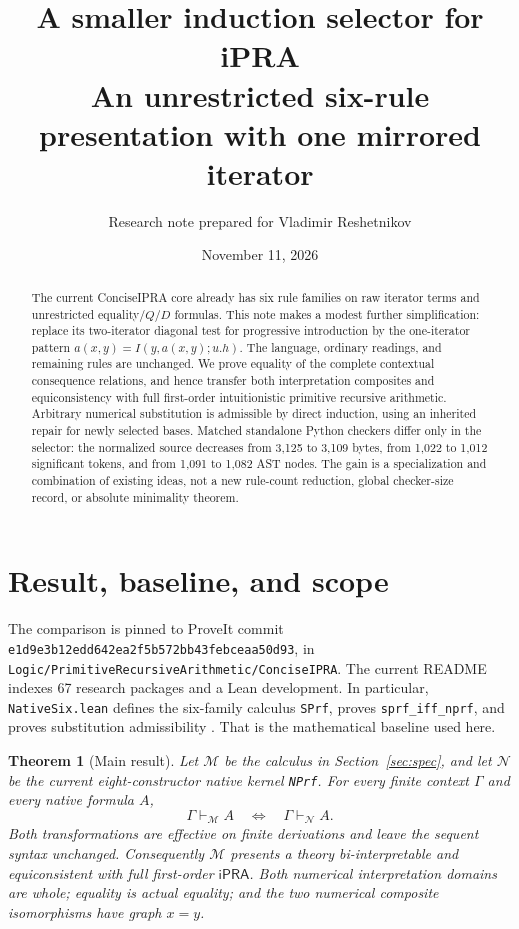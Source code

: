 \documentclass[11pt]{article}
\title{A smaller induction selector for iPRA\\
  \large An unrestricted six-rule presentation with one mirrored iterator}
\author{Research note prepared for Vladimir Reshetnikov}
\date{November 11, 2026}
\newtheorem{theorem}{Theorem}[section]
\theoremstyle{definition}\newtheorem{definition}[theorem]{Definition}
\newcommand{\Mcal}{\mathcal M}
\newcommand{\Ncal}{\mathcal N}
\newcommand{\ipra}{\mathsf{iPRA}}
\begin{document}
\maketitle
\begin{abstract}
The current ConciseIPRA core already has six rule families on raw iterator
terms and unrestricted equality/$Q$/$D$ formulas. This note makes a modest
further simplification: replace its two-iterator diagonal test for
progressive introduction by the one-iterator pattern
$a(x,y)=I(y,a(x,y);u.h)$. The language, ordinary readings, and remaining
rules are unchanged. We prove equality of the complete contextual
consequence relations, and hence transfer both interpretation composites
and equiconsistency with full first-order intuitionistic primitive
recursive arithmetic. Arbitrary numerical substitution is admissible by
direct induction, using an inherited repair for newly selected bases.
Matched standalone Python checkers differ only in the selector: the
normalized source decreases from 3,125 to 3,109 bytes, from 1,022 to 1,012
significant tokens, and from 1,091 to 1,082 AST nodes. The gain is a
specialization and combination of existing ideas, not a new rule-count
reduction, global checker-size record, or absolute minimality theorem.
\end{abstract}
\tableofcontents
\newpage

\section{Result, baseline, and scope}

The comparison is pinned to ProveIt commit
\texttt{e1d9e3b12edd642ea2f5b572bb43febceaa50d93}, in
\texttt{Logic/PrimitiveRecursiveArithmetic/ConciseIPRA}. The current
README indexes 67 research packages and a Lean development. In particular,
\texttt{NativeSix.lean} defines the six-family calculus \texttt{SPrf},
proves \texttt{sprf\_iff\_nprf}, and proves substitution admissibility
\cite{readme,six}. That is the mathematical baseline used here.

\begin{theorem}[Main result]\label{thm:main}
Let $\Mcal$ be the calculus in Section~\ref{sec:spec}, and let $\Ncal$
be the current eight-constructor native kernel \texttt{NPrf}.
For every finite context $\Gamma$ and every native formula $A$,
\[
 \Gamma\vdash_{\Mcal}A
 \quad\Longleftrightarrow\quad
 \Gamma\vdash_{\Ncal}A.
\]
Both transformations are effective on finite derivations and leave the
sequent syntax unchanged. Consequently $\Mcal$ presents a theory
bi-interpretable and equiconsistent with full first-order $\ipra$.
Both numerical interpretation domains are whole; equality is actual
equality; and the two numerical composite isomorphisms have graph $x=y$.
\end{theorem}
\end{document}
